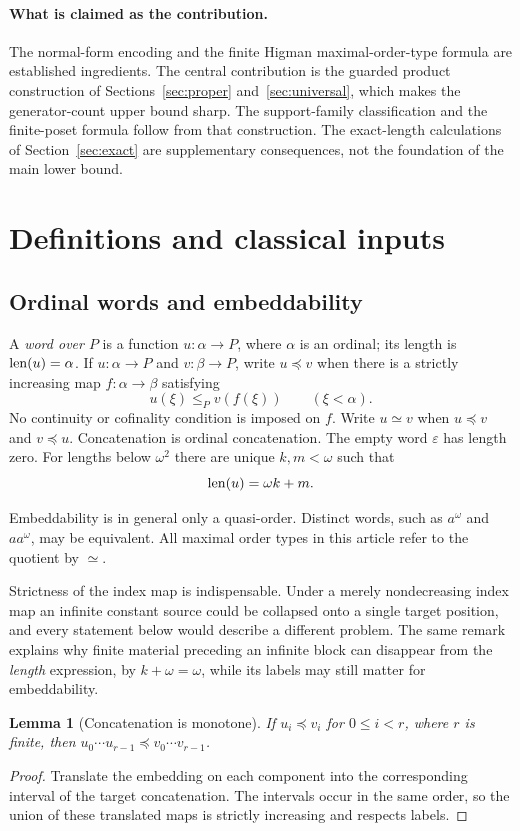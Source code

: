 \documentclass[11pt,a4paper]{article}
\numberwithin{equation}{section}
\newtheorem{lemma}[theorem]{Lemma}
\theoremstyle{definition}
\theoremstyle{remark}
\newcommand{\eps}{\varepsilon}
\newcommand{\len}{\mathop{\rm len}}
\newcommand{\emb}{\preccurlyeq}
\newcommand{\eqv}{\simeq}
\begin{document}
\paragraph{What is claimed as the contribution.}
The normal-form encoding and the finite Higman maximal-order-type formula are
established ingredients. The central contribution is the guarded product
construction of Sections~\ref{sec:proper} and~\ref{sec:universal}, which makes
the generator-count upper bound sharp. The support-family classification and
the finite-poset formula follow from that construction. The exact-length
calculations of Section~\ref{sec:exact} are supplementary consequences, not
the foundation of the main lower bound.

\section{Definitions and classical inputs}
\label{sec:prelim}

\subsection{Ordinal words and embeddability}
A \emph{word over $P$} is a function $u:\alpha\to P$, where $\alpha$ is an
ordinal; its length is $\len(u)=\alpha$. If $u:\alpha\to P$ and
$v:\beta\to P$, write $u\emb v$ when there is a strictly increasing map
$f:\alpha\to\beta$ satisfying
\[
 u(\xi)\le_P v(f(\xi))\qquad(\xi<\alpha).
\]
No continuity or cofinality condition is imposed on $f$. Write $u\eqv v$
when $u\emb v$ and $v\emb u$. Concatenation is ordinal concatenation. The
empty word $\eps$ has length zero. For lengths below $\omega^2$ there are
unique $k,m<\omega$ such that
\[
 \len(u)=\omega k+m.
\]

Embeddability is in general only a quasi-order. Distinct words, such as
$a^\omega$ and $aa^\omega$, may be equivalent. All maximal order types in
this article refer to the quotient by $\eqv$.

Strictness of the index map is indispensable. Under a merely nondecreasing
index map an infinite constant source could be collapsed onto a single target
position, and every statement below would describe a different problem. The
same remark explains why finite material preceding an infinite block can
disappear from the \emph{length} expression, by $k+\omega=\omega$, while its
labels may still matter for embeddability.

\begin{lemma}[Concatenation is monotone]\label{lem:concat}
If $u_i\emb v_i$ for $0\le i<r$, where $r$ is finite, then
$u_0\cdots u_{r-1}\emb v_0\cdots v_{r-1}$.
\end{lemma}
\begin{proof}
Translate the embedding on each component into the corresponding interval
of the target concatenation. The intervals occur in the same order, so the
union of these translated maps is strictly increasing and respects labels.
\end{proof}
\end{document}
